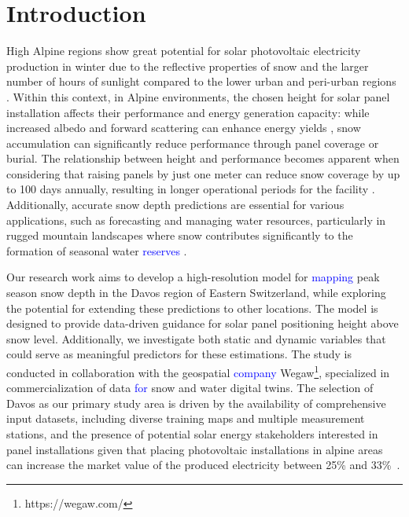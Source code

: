 \documentclass[preprint,12pt]{elsarticle}
\begin{document}

\section{Introduction}
\label{Sec:introduction}

High Alpine regions show great potential for solar photovoltaic electricity production in winter due to the reflective properties of snow \cite{xu2013snow} and the larger number of hours of sunlight compared to the lower urban and peri-urban regions \cite{fenrg.2024}. Within this context, in Alpine environments, the chosen height for solar panel installation affects their performance and energy generation capacity: while increased albedo and forward scattering can enhance energy yields \cite{vonRtte2021}, snow accumulation can significantly reduce performance through panel coverage or burial. The relationship between height and performance becomes apparent when considering that raising panels by just one meter can reduce snow coverage by up to 100 days annually, resulting in longer operational periods for the facility \cite{wegawSuperResolutionSnow}. Additionally, accurate snow depth predictions are essential for various applications, such as forecasting and managing water resources, particularly in rugged mountain landscapes where snow contributes significantly to the formation of seasonal water \textcolor{blue}{reserves} \cite{dewalle2008principles}.

Our research work aims to develop a high-resolution model for \textcolor{blue}{mapping} peak season snow depth in the Davos region of Eastern Switzerland, while exploring the potential for extending these predictions to other locations. The model is designed to provide data-driven guidance for solar panel positioning height above snow level. Additionally, we investigate both static and dynamic variables that could serve as meaningful predictors for these estimations. The study is conducted in collaboration with the geospatial \textcolor{blue}{company} Wegaw\footnote{https://wegaw.com/}, specialized in commercialization of data \textcolor{blue}{for} snow and water digital twins. The selection of Davos as our primary study area is driven by the availability of comprehensive input datasets, including diverse training maps and multiple measurement stations, and the presence of potential solar energy stakeholders interested in panel installations given that placing photovoltaic installations in alpine areas can increase the market value of the produced electricity between 25\% and 33\%~\cite{Kahl2019,Dujardin2022}. 
\end{document}
